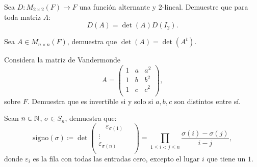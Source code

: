 \documentclass[12pt,a4paper]{book}
\begin{document}
    \begin{ejercicio}
        Sea $D : M_{2 \times 2}(F) \to F$ una función alternante y $2$-lineal. Demuestre que para toda matriz $A$:
        \begin{equation*}
        D(A) =  \det(A) D(I_{2}).
        \end{equation*}
    \end{ejercicio}

    \begin{ejercicio}
        Sea $A \in M_{n \times n}(F)$, demuestra que $\det(A) = \det(A^{t})$.
    \end{ejercicio}

    \begin{ejercicio}
        Considera la matriz de Vandermonde
        \begin{equation*}
        A = 
        \begin{pmatrix}
            1 & a & a^{2}\\
            1 & b & b^{2}\\
            1 & c & c^{2}\\
        \end{pmatrix},
        \end{equation*}
        sobre $F$. Demuestra que es invertible si y solo si $a, b, c$ son distintos entre sí.
    \end{ejercicio}

    \begin{ejercicio}
        Sean $n \in \mathbb{N}$, $\sigma \in S_{n}$, demuestra que:
        \begin{equation*}
        \text{signo}(\sigma) \coloneqq \det
        \begin{pmatrix}
            \quad \varepsilon_{\sigma (1)} \quad \\
            \vdots\\
            \varepsilon_{\sigma (n)}\\
        \end{pmatrix}
        = \prod_{1 \leq i < j \leq n} \frac{\sigma (i) - \sigma(j)}{i - j},
        \end{equation*}
        donde $\varepsilon_{i}$ es la fila con todas las entradas cero, excepto el lugar $i$ que tiene un $1$.
    \end{ejercicio}

\end{document}
